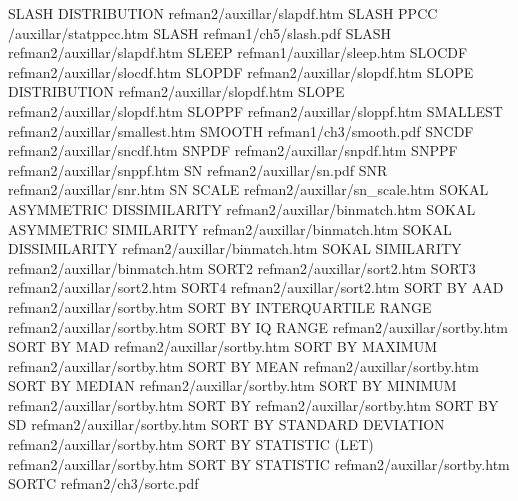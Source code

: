 SLASH DISTRIBUTION                      refman2/auxillar/slapdf.htm
SLASH PPCC                              /auxillar/statppcc.htm
SLASH                                   refman1/ch5/slash.pdf
SLASH                                   refman2/auxillar/slapdf.htm
SLEEP                                   refman1/auxillar/sleep.htm
SLOCDF                                  refman2/auxillar/slocdf.htm
SLOPDF                                  refman2/auxillar/slopdf.htm
SLOPE DISTRIBUTION                      refman2/auxillar/slopdf.htm
SLOPE                                   refman2/auxillar/slopdf.htm
SLOPPF                                  refman2/auxillar/sloppf.htm
SMALLEST                                refman2/auxillar/smallest.htm
SMOOTH                                  refman1/ch3/smooth.pdf
SNCDF                                   refman2/auxillar/sncdf.htm
SNPDF                                   refman2/auxillar/snpdf.htm
SNPPF                                   refman2/auxillar/snppf.htm
SN                                      refman2/auxillar/sn.pdf
SNR                                     refman2/auxillar/snr.htm
SN SCALE                                refman2/auxillar/sn_scale.htm
SOKAL ASYMMETRIC DISSIMILARITY          refman2/auxillar/binmatch.htm
SOKAL ASYMMETRIC SIMILARITY             refman2/auxillar/binmatch.htm
SOKAL DISSIMILARITY                     refman2/auxillar/binmatch.htm
SOKAL SIMILARITY                        refman2/auxillar/binmatch.htm
SORT2                                   refman2/auxillar/sort2.htm
SORT3                                   refman2/auxillar/sort2.htm
SORT4                                   refman2/auxillar/sort2.htm
SORT BY AAD                             refman2/auxillar/sortby.htm
SORT BY INTERQUARTILE RANGE             refman2/auxillar/sortby.htm
SORT BY IQ RANGE                        refman2/auxillar/sortby.htm
SORT BY MAD                             refman2/auxillar/sortby.htm
SORT BY MAXIMUM                         refman2/auxillar/sortby.htm
SORT BY MEAN                            refman2/auxillar/sortby.htm
SORT BY MEDIAN                          refman2/auxillar/sortby.htm
SORT BY MINIMUM                         refman2/auxillar/sortby.htm
SORT BY                                 refman2/auxillar/sortby.htm
SORT BY SD                              refman2/auxillar/sortby.htm
SORT BY STANDARD DEVIATION              refman2/auxillar/sortby.htm
SORT BY STATISTIC (LET)                 refman2/auxillar/sortby.htm
SORT BY STATISTIC                       refman2/auxillar/sortby.htm
SORTC                                   refman2/ch3/sortc.pdf
